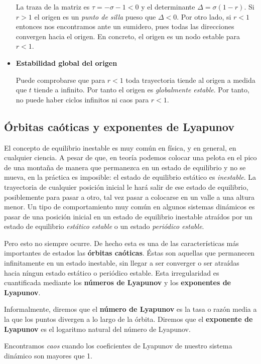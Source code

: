 \begin{itemize}
La traza de la matriz es $τ=-σ-1<0$ y el determinante $Δ = σ(1-r)$. Si $r>1$ el origen es un \emph{punto de silla} pueso que $Δ<0$. Por otro lado, si $r<1$ entonces nos encontramos ante un sumidero, pues todas las direcciones convergen hacia el origen. En concreto, el origen es un nodo estable para $r<1$.

\item \textbf{Estabilidad global del origen}

Puede comprobarse que para $r<1$ toda trayectoria tiende al origen a medida que $t$ tiende a infinito. Por tanto el origen es \emph{globalmente estable}. Por tanto, no puede haber ciclos infinitos ni caos para $r<1$.

\end{itemize}

\subsection{Órbitas caóticas y exponentes de Lyapunov}

El concepto de equilibrio inestable es muy común en física, y en general, en cualquier ciencia. A pesar de que, en teoría podemos colocar una pelota en el pico de una montaña de manera que permanezca en un estado de equilibrio y no se mueva, en la práctica es imposible: el estado de equilibrio estático es \emph{inestable}. La trayectoria de cualquier posición inicial le hará salir de ese estado de equilibrio, posiblemente para pasar a otro, tal vez pasar a colocarse en un valle a una altura menor. Un tipo de comportamiento muy común en algunos sistemas dinámicos es pasar de una posición inicial en un estado de equilibrio inestable atraídos por un estado de equilibrio \emph{estático} \emph{estable} o un estado \emph{periódico estable}.

Pero esto no siempre ocurre. De hecho esta es una de las características más importantes de estados las \textbf{órbitas caóticas}. Éstas son aquellas que permanecen infinitamente en un estado inestable, sin llegar a ser converger o ser atraídas hacia níngun estado estático o periódico estable. Esta irregularidad es cuantificada mediante los \textbf{números de Lyapunov} y los \textbf{exponentes de Lyapunov}.

Informalmente, diremos que el \textbf{número de Lyapunov} es la tasa o razón media a la que los puntos divergen a lo largo de la órbita. Diremos que el \textbf{exponente de Lyapunov} es el logaritmo natural del número de Lyapunov.

Encontramos \emph{caos} cuando los coeficientes de Lyapunov de nuestro sistema dinámico son mayores que 1.

